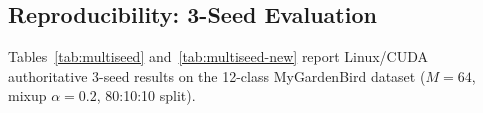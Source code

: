 \documentclass[final,5p,times,twocolumn,nolinenum]{elsarticle}
\begin{document}
\subsection{Reproducibility: 3-Seed Evaluation}
\label{sec:reproducibility}

Tables~\ref{tab:multiseed} and~\ref{tab:multiseed-new} report Linux/CUDA
authoritative 3-seed results on the 12-class MyGardenBird dataset
($M=64$, mixup $\alpha=0.2$, 80:10:10 split).

\begin{table}[ht]
\centering
\caption{3-seed reproducibility --- key MCU-compatible models
         (Linux/CUDA, 12-class, 80:10:10, INT8 accuracy).}
\label{tab:multiseed}
\end{table}
\end{document}
